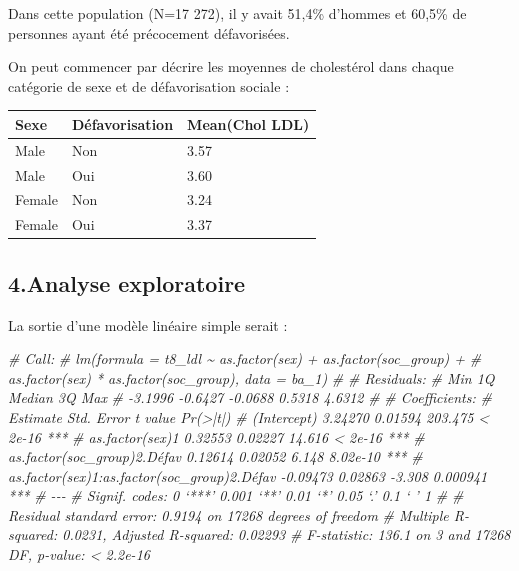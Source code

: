 \documentclass[
]{book}
\newenvironment{Shaded}{\begin{snugshade}}{\end{snugshade}}
\newcommand{\CommentTok}[1]{\textcolor[rgb]{0.56,0.35,0.01}{\textit{#1}}}
\begin{document}
Dans cette population (N=17 272), il y avait 51,4\% d'hommes et 60,5\% de personnes ayant été précocement défavorisées.

On peut commencer par décrire les moyennes de cholestérol dans chaque catégorie de sexe et de défavorisation sociale :

\begin{table}
\centering
\begin{tabular}[t]{l|l|l}
\hline
Sexe & Défavorisation & Mean(Chol LDL)\\
\hline
Male & Non & 3.57\\
\hline
Male & Oui & 3.60\\
\hline
Female & Non & 3.24\\
\hline
Female & Oui & 3.37\\
\hline
\end{tabular}
\end{table}

\hypertarget{analyse-exploratoire}{%
\subsection*{4.Analyse exploratoire}\label{analyse-exploratoire}}

La sortie d'une modèle linéaire simple serait :

\begin{Shaded}
\begin{Highlighting}[]
\CommentTok{\# Call:}
\CommentTok{\# lm(formula = t8\_ldl \textasciitilde{} as.factor(sex) + as.factor(soc\_group) + }
\CommentTok{\#     as.factor(sex) * as.factor(soc\_group), data = ba\_1)}
\CommentTok{\# }
\CommentTok{\# Residuals:}
\CommentTok{\#     Min      1Q  Median      3Q     Max }
\CommentTok{\# {-}3.1996 {-}0.6427 {-}0.0688  0.5318  4.6312 }
\CommentTok{\# }
\CommentTok{\# Coefficients:}
\CommentTok{\#                                             Estimate Std. Error t value Pr(\textgreater{}|t|)    }
\CommentTok{\# (Intercept)                                  3.24270    0.01594 203.475  \textless{} 2e{-}16 ***}
\CommentTok{\# as.factor(sex)1                              0.32553    0.02227  14.616  \textless{} 2e{-}16 ***}
\CommentTok{\# as.factor(soc\_group)2.Défav                  0.12614    0.02052   6.148 8.02e{-}10 ***}
\CommentTok{\# as.factor(sex)1:as.factor(soc\_group)2.Défav {-}0.09473    0.02863  {-}3.308 0.000941 ***}
\CommentTok{\# {-}{-}{-}}
\CommentTok{\# Signif. codes:  0 ‘***’ 0.001 ‘**’ 0.01 ‘*’ 0.05 ‘.’ 0.1 ‘ ’ 1}
\CommentTok{\# }
\CommentTok{\# Residual standard error: 0.9194 on 17268 degrees of freedom}
\CommentTok{\# Multiple R{-}squared:  0.0231,  Adjusted R{-}squared:  0.02293 }
\CommentTok{\# F{-}statistic: 136.1 on 3 and 17268 DF,  p{-}value: \textless{} 2.2e{-}16}
\end{Highlighting}
\end{Shaded}
\end{document}
